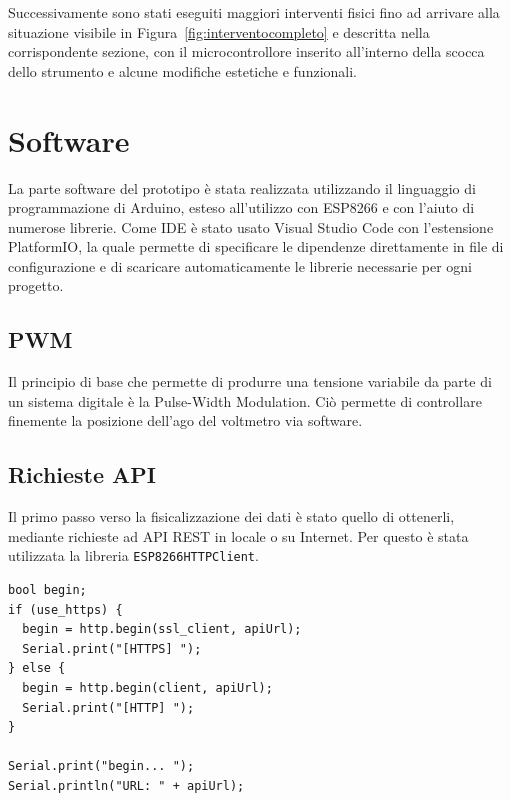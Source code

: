 \documentclass[12pt,a4paper]{report}
\begin{document}
Successivamente sono stati eseguiti maggiori interventi fisici fino ad arrivare alla situazione visibile in Figura~\ref{fig:interventocompleto}
e descritta nella corrispondente sezione, con il microcontrollore inserito all'interno della scocca dello strumento e alcune modifiche estetiche
e funzionali.

\section{Software}
La parte software del prototipo è stata realizzata utilizzando il linguaggio di programmazione di Arduino, esteso all'utilizzo con
ESP8266 e con l'aiuto di numerose librerie. Come IDE è stato usato Visual Studio Code con l'estensione PlatformIO, la quale
permette di specificare le dipendenze direttamente in file di configurazione e di scaricare automaticamente le librerie necessarie
per ogni progetto.

\subsection{PWM}
Il principio di base che permette di produrre una tensione variabile da parte di un sistema digitale è la Pulse-Width Modulation.
Ciò permette di controllare finemente la posizione dell'ago del voltmetro via software.

\subsection{Richieste API}
Il primo passo verso la fisicalizzazione dei dati è stato quello di ottenerli, mediante richieste ad API REST in locale o su Internet.
Per questo è stata utilizzata la libreria \texttt{ESP8266HTTPClient}.

\begin{lstlisting}
bool begin;
if (use_https) {
  begin = http.begin(ssl_client, apiUrl);
  Serial.print("[HTTPS] ");
} else {
  begin = http.begin(client, apiUrl);
  Serial.print("[HTTP] ");
}

Serial.print("begin... ");
Serial.println("URL: " + apiUrl);
\end{lstlisting}
\end{document}
